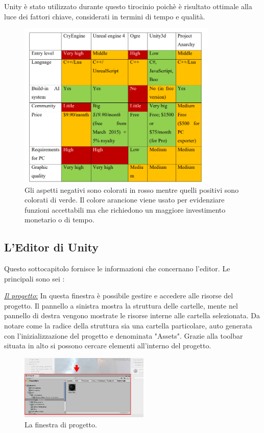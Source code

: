 Unity è stato utilizzato durante questo tirocinio poichè è risultato ottimale alla luce dei fattori chiave, considerati in termini di tempo e qualità.
\begin{figure}[H]
	\includegraphics[width=0.85\textwidth]{figure/EngineComp}
	\centering
	\vspace{0.3cm}
\caption{Gli aspetti negativi sono colorati in rosso mentre quelli positivi sono colorati di verde. Il colore arancione viene usato per evidenziare funzioni accettabili ma che richiedono un maggiore investimento monetario o di tempo. \cite{ThesisUnity}}
\end{figure}

\newpage

\subsection{L'Editor di Unity}
Questo sottocapitolo fornisce le informazioni che concernano l'editor. Le principali sono sei \cite{UnityEditor}: 
\begin{flushleft}
	\underline{\textit{Il progetto}:}
	In questa finestra è possibile gestire e accedere alle risorse del progetto. Il pannello a sinistra mostra la struttura delle cartelle, mente nel pannello di destra vengono mostrate le risorse interne alle cartella selezionata. Da notare come la radice della struttura sia una cartella particolare, auto generata con l'inizializzazione del progetto e denominata "Assets". Grazie alla toolbar situata in alto si possono cercare elementi all'interno del progetto.
\end{flushleft}

\begin{figure}[H]
	\includegraphics[width=0.55\textwidth]{figure/Project}
	\centering
	\caption{La finestra di progetto.}
\end{figure}

